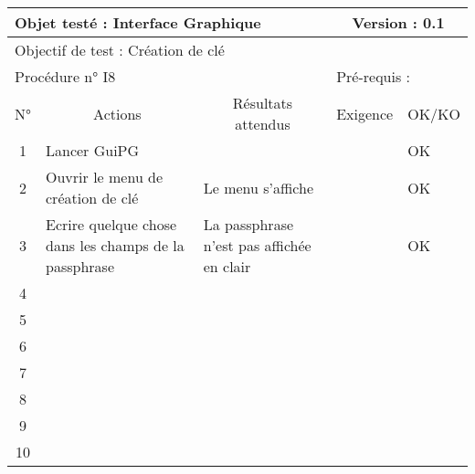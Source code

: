 \documentclass{../res/univ-projet}
\begin{document}
\begin{center}
    \begin{tabular}{|c|p{5cm}|p{5cm}|p{1.5cm}|p{1.5cm}|}
      \hline
      \multicolumn{3}{|l|}{Objet testé : Interface Graphique} & \multicolumn{2}{c|}{Version : 0.1}\\ \hline
      \multicolumn{5}{|l|}{Objectif de test : Création de clé}\\ \hline
      \multicolumn{3}{|l|}{Procédure n° I8} & \multicolumn{2}{p{3cm}|}{Pré-requis : }\\ \hline
      \multicolumn{1}{|c|}{N°} & \multicolumn{1}{c|}{Actions} & \multicolumn{1}{c|}{Résultats attendus} & 
      \multicolumn{1}{c|}{Exigence} & \multicolumn{1}{c|}{OK/KO}\\ \hline
      1 & Lancer GuiPG &  &  & OK \\
      2 & Ouvrir le menu de création de clé & Le menu s'affiche &  & OK\\
      3 & Ecrire quelque chose dans les champs de la passphrase & La passphrase n'est pas affichée en clair &  & OK\\ 
      4 &  &  &  & \\
      5 &  &  &  & \\
      6 &  &  &  & \\
      7 &  &  &  & \\
      8 &  &  &  & \\
      9 &  &  &  & \\
      10 &  &  &  &\\ 
	\hline
    \end{tabular}
    \vskip 2.2cm




\end{center}
\end{document}
